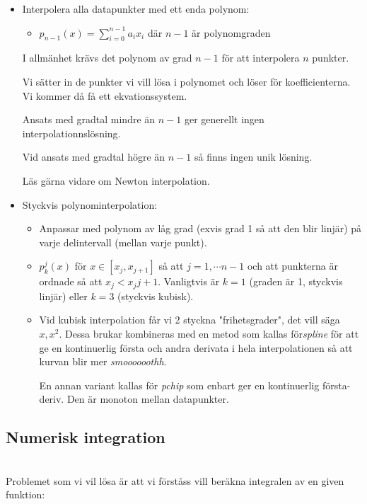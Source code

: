 \begin{itemize}
  \item Interpolera alla datapunkter med ett enda polynom:
    \begin{itemize}
      \item $p_{n-1}(x)=\sum_{i=0}^{n-1}a_ix_i$ där $n-1$ är polynomgraden
    \end{itemize}
    \par\bigskip
    I allmänhet krävs det polynom av grad $n-1$ för att interpolera $n$ punkter.
    \par\bigskip
    Vi sätter in de punkter vi vill lösa i polynomet och löser för koefficienterna. Vi kommer då få ett ekvationssystem.
    \par\bigskip
    Ansats med gradtal mindre än $n-1$ ger generellt ingen interpolationnslösning.
    \par\bigskip
    Vid ansats med gradtal högre än $n-1$ så finns ingen unik lösning.
    \par\bigskip
    Läs gärna vidare om Newton interpolation.

  \item Styckvis polynominterpolation:
    \begin{itemize}
      \item Anpassar med polynom av låg grad (exvis grad 1 så att den blir linjär) på varje delintervall (mellan varje punkt).
      \item $p_{k}^{j}(x)$ för $x\in[x_j,x_{j+1}]$ så att $j=1,\cdots n-1$ och att punkterna är ordnade så att $x_j<x_j{j+1}$. Vanligtvis är $k=1$ (graden är 1, styckvis linjär) eller $k=3$ (styckvis kubisk).
      \item Vid kubisk interpolation får vi 2 styckna "frihetsgrader", det vill säga $x, x^2$. Dessa brukar kombineras med en metod som kallas för\textit{spline} för att ge en kontinuerlig första och andra derivata i hela interpolationen så att kurvan blir mer \textit{smoooooothh}.
        \par
        En annan variant kallas för \textit{pchip} som enbart ger en kontinuerlig första-deriv. Den är monoton mellan datapunkter.
    \end{itemize}
\end{itemize}

\subsection{Numerisk integration}\hfill\\
\noindent Problemet som vi vil lösa är att vi förståss vill beräkna integralen av en given funktion:

